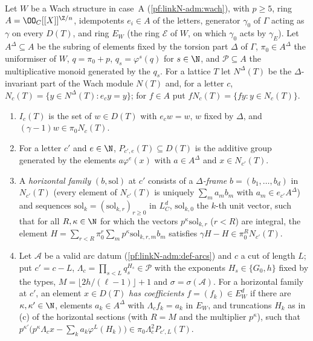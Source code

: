 \begin{definition}\label{pf:linkN-adm:def-wc}
Let $W$ be a Wach structure in case~A (\cref{pf:linkN-adm:wach}), with $p\ge5$, ring $A=\OO_C[[X]]^{\Z/n}$, idempotents
$e_i\in A$ of the letters, generator $\gamma_0$ of $\Gamma$ acting as $\gamma$ on every $D(T)$, and ring $E_W$ (the ring
$\mathcal E$ of $W$, on which $\gamma_0$ acts by $\gamma_E$). Let $A^\Delta\subseteq A$ be the subring of elements fixed by
the torsion part $\Delta$ of $\Gamma$, $\pi_0\in A^\Delta$ the uniformiser of $W$, $q=\pi_0+p$, $q_s=\varphi^s(q)$ for
$s\in\N$, and $\mathcal P\subseteq A$ the multiplicative monoid generated by the $q_s$. For a lattice $T$ let $N^\Delta(T)$
be the $\Delta$-invariant part of the Wach module $N(T)$ and, for a letter $c$, $N_c(T)=\{y\in N^\Delta(T):e_cy=y\}$; for
$f\in A$ put $fN_c(T)=\{fy:y\in N_c(T)\}$.
\begin{enumerate}[label=(\alph*)]
\item $I_c(T)$ is the set of $w\in D(T)$ with $e_cw=w$, $w$ fixed by $\Delta$, and $(\gamma-1)w\in\pi_0N_c(T)$.
\item For a letter $c'$ and $e\in\N$, $P_{c',e}(T)\subseteq D(T)$ is the additive group generated by the elements
  $a\varphi^e(x)$ with $a\in A^\Delta$ and $x\in N_{c'}(T)$.
\item A \emph{horizontal family} $(b,\mathrm{sol})$ at $c'$ consists of a \emph{$\Delta$-frame} $b=(b_1,\dots,b_d)$ in
  $N_{c'}(T)$ (every element of $N_{c'}(T)$ is uniquely $\sum_ma_mb_m$ with $a_m\in e_{c'}A^\Delta$) and sequences
  $\mathrm{sol}_k=(\mathrm{sol}_{k,r})_{r\ge0}$ in $L_C^d$, $\mathrm{sol}_{k,0}$ the $k$-th unit vector, such that for
  all $R,\kappa\in\N$ for which the vectors $p^\kappa\mathrm{sol}_{k,r}$ ($r<R$) are integral, the element
  $H=\sum_{r<R}\pi_0^r\sum_mp^\kappa\mathrm{sol}_{k,r,m}b_m$ satisfies $\gamma H-H\in\pi_0^RN_{c'}(T)$.
\item Let $\mathcal A$ be a valid arc datum (\cref{pf:linkN-adm:def-arcs}) and $c$ a cut of length $L$; put $c'=c-L$,
  $\Lambda_c=\prod_{s<L}q_s^{H_s}\in\mathcal P$ with the exponents $H_s\in\{G_0,h\}$ fixed by the types,
  $M=\lfloor2h/(\ell-1)\rfloor+1$ and $\sigma=\sigma(\mathcal A)$. For a horizontal family at $c'$, an element $x\in D(T)$
  \emph{has coefficients} $f=(f_k)\in E_W^d$ if there are $\kappa,\kappa'\in\N$, elements $a_k\in A^\Delta$ with
  $\Lambda_cf_k=a_k$ in $E_W$, and truncations $H_k$ as in (c) of the horizontal sections (with $R=M$ and the multiplier
  $p^\kappa$), such that $p^{\kappa'}\bigl(p^\kappa\Lambda_cx-\sum_ka_k\varphi^L(H_k)\bigr)\in\pi_0\Lambda_c^2P_{c',L}(T)$.

\end{enumerate}
\end{definition}
